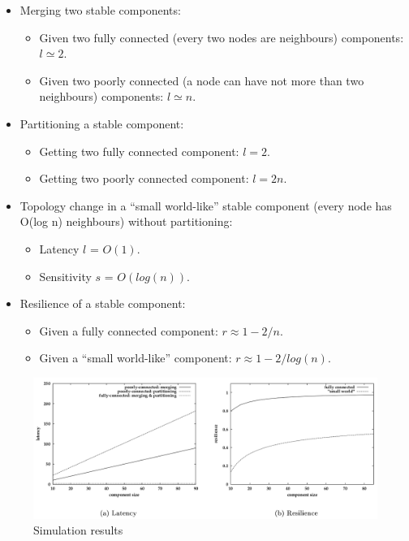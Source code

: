 \begin{itemize}
\item Merging two stable components:

\begin{itemize}
\item Given two fully connected (every two nodes are neighbours) components: $l \simeq 2$.
\item Given two poorly connected (a node can have not more than two neighbours) components: $l \simeq n$.
\end{itemize}

\item Partitioning a stable component:

\begin{itemize}
\item Getting two fully connected component: $l = 2$.
\item Getting two poorly connected component: $l = 2n$.
\end{itemize}

\item Topology change in a “small world-like” stable component (every node has O(log n) neighbours) without partitioning:
\begin{itemize}
\item Latency $l$ = $O(1)$.
\item Sensitivity $s$ = $O(log(n))$.
\end{itemize}

\item Resilience of a stable component:

\begin{itemize}
\item Given a fully connected component: $r \approx 1 - 2/n$.
\item Given a “small world-like” component: $r \approx 1 - 2/log(n)$.
\end{itemize}

\end{itemize}


\begin{figure}[hbtp]
\centering
\includegraphics[scale=.4]{performance_test.png}
\caption{Simulation results}
\end{figure}